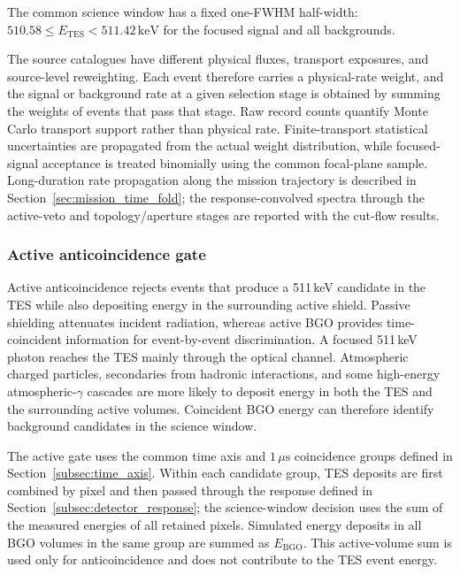 \documentclass[11pt]{article}
\newcommand{\keV}{\ensuremath{\,\mathrm{keV}}}
\begin{document}
The common science window has a fixed one-FWHM half-width:
$510.58\leq E_{\mathrm{TES}}<511.42\keV$ for the focused signal and all
backgrounds.



The source catalogues have different physical fluxes, transport exposures, and
source-level reweighting. Each event therefore carries a physical-rate weight,
and the signal or background rate at a given selection stage is obtained by
summing the weights of events that pass that stage. Raw record counts quantify
Monte Carlo transport support rather than physical rate. Finite-transport
statistical uncertainties are propagated from the actual weight distribution,
while focused-signal acceptance is treated binomially using the common focal-plane
sample. Long-duration rate propagation along the mission trajectory is described
in Section~\ref{sec:mission_time_fold}; the response-convolved spectra through
the active-veto and topology/aperture stages are reported with the cut-flow results.

\subsubsection{Active anticoincidence gate}

Active anticoincidence rejects events that produce a 511\,keV candidate in the
TES while also depositing energy in the surrounding active shield. Passive
shielding attenuates incident radiation, whereas active BGO provides
time-coincident information for event-by-event discrimination. A focused
511\,keV photon reaches the TES mainly through the optical channel. Atmospheric
charged particles, secondaries from hadronic interactions, and some
high-energy atmospheric-$\gamma$ cascades are more likely to deposit energy in both the TES
and the surrounding active volumes. Coincident BGO energy can therefore
identify background candidates in the science window.

The active gate uses the common time axis and $1\,\mu\mathrm{s}$ coincidence
groups defined in Section~\ref{subsec:time_axis}. Within each candidate group,
TES deposits are first combined by pixel and then passed through the response
defined in Section~\ref{subsec:detector_response}; the science-window decision
uses the sum of the measured energies of all retained pixels. Simulated energy
deposits in all BGO volumes in the same group are summed as
$E_{\mathrm{BGO}}$. This active-volume sum is used only for anticoincidence and
does not contribute to the TES event energy.
\end{document}
